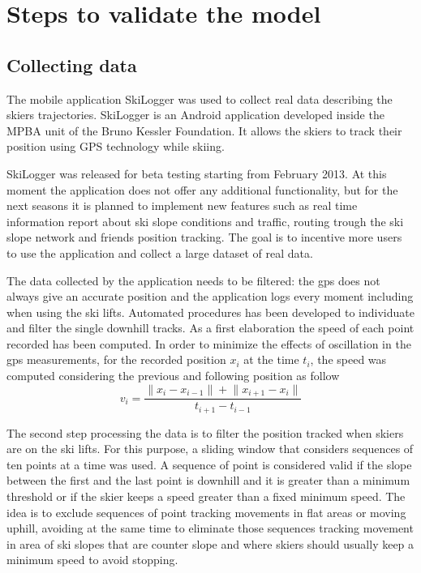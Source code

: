 \documentclass[12pt,a4paper,twoside]{book}
\newcommand{\norm}[1]{\lVert#1\rVert}
\begin{document}
\chapter{Steps to validate the model}\label{steps_validate}
\section{Collecting data}
The mobile application SkiLogger was used to collect real data describing the skiers trajectories. SkiLogger is an Android application developed inside the MPBA unit of the Bruno Kessler Foundation. It allows the skiers to track their position using GPS technology while skiing.

SkiLogger was released for beta testing starting from February 2013. At this moment the application does not offer any additional functionality, but for the next seasons it is planned to implement new features such as real time information report about ski slope conditions and traffic, routing trough the ski slope network and friends position tracking. The goal is to incentive more users to use the application and collect a large dataset of real data.

The data collected by the application needs to be filtered: the gps does not always give an accurate position and the application logs every moment including when using the ski lifts. Automated procedures has been developed to individuate and filter the single downhill tracks. As a first elaboration the speed of each point recorded has been computed. In order to minimize the effects of oscillation in the gps measurements, for the recorded position $x_i$ at the time $t_i$, the speed was computed considering the previous and following position as follow
\begin{equation}
v_i=\frac{\norm{x_i-x_{i-1}}+\norm{x_{i+1}-x_i}}{t_{i+1}-t_{i-1}}
\end{equation}

The second step processing the data is to filter the position tracked when skiers are on the ski lifts. For this purpose, a sliding window that considers sequences of ten points at a time was used. A sequence of point is considered valid if the slope between the first and the last point is downhill and it is greater than a minimum threshold or if the skier keeps a speed greater than a fixed minimum speed. The idea is to exclude sequences of point tracking movements in flat areas or moving uphill, avoiding at the same time to eliminate those sequences tracking movement in area of ski slopes that are counter slope and where skiers should usually keep a minimum speed to avoid stopping.
\end{document}
